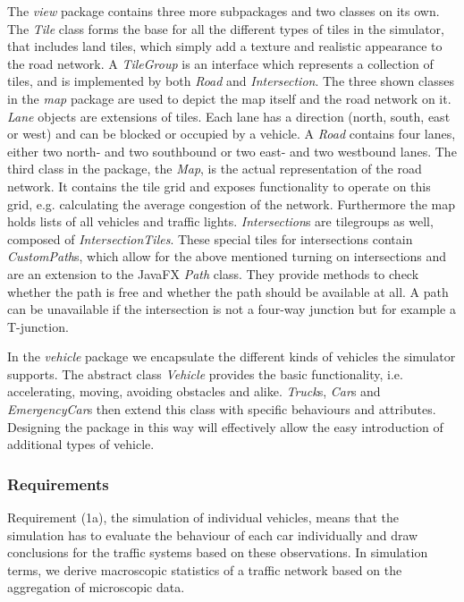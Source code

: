 The \textit{view} package contains three more subpackages and two classes on its own. The \textit{Tile} class forms the base for all the different types of tiles in the simulator, that includes land tiles, which simply add a texture and realistic appearance to the road network. A \textit{TileGroup} is an interface which represents a collection of tiles, and is implemented by both \textit{Road} and \textit{Intersection}.  The three shown classes in the \textit{map} package are used to depict the map itself and the road network on it. \textit{Lane} objects are extensions of tiles. Each lane has a direction (north, south, east or west) and can be blocked or occupied by a vehicle. A \textit{Road} contains four lanes, either two north- and two southbound or two east- and two westbound lanes. The third class in the package, the \textit{Map}, is the actual representation of the road network. It contains the tile grid and exposes functionality to operate on this grid, e.g. calculating the average congestion of the network. Furthermore the map holds lists of all vehicles and traffic lights. \textit{Intersection}s are tilegroups as well, composed of \textit{IntersectionTiles}. These special tiles for intersections contain \textit{CustomPath}s, which allow for the above mentioned turning on intersections and are an extension to the JavaFX \textit{Path} class. They provide methods to check whether the path is free and whether the path should be available at all. A path can be unavailable if the intersection is not a four-way junction but for example a T-junction.  

In the \textit{vehicle} package we encapsulate the different kinds of vehicles the simulator supports. The abstract class \textit{Vehicle} provides the basic functionality, i.e. accelerating, moving, avoiding obstacles and alike. \textit{Truck}s, \textit{Car}s and \textit{EmergencyCar}s then extend this class with specific behaviours and attributes. Designing the package in this way will effectively allow the easy introduction of additional types of vehicle.

\subsubsection{Requirements}
Requirement (1a), the simulation of individual vehicles, means that the simulation has to evaluate the behaviour of each car individually and draw conclusions for the traffic systems based on these observations. In simulation terms, we derive macroscopic statistics of a traffic network based on the aggregation of microscopic data.

